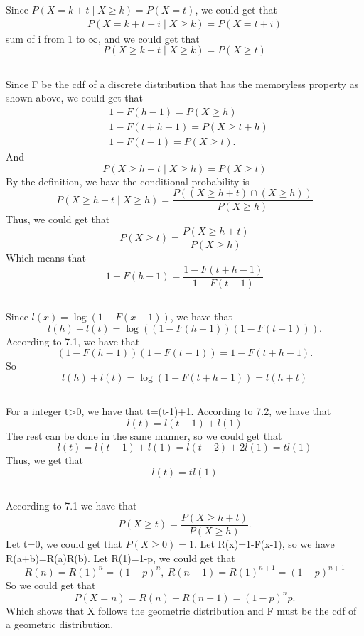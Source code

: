 \documentclass[10.5pt]{article}
\begin{document}
\section{}
Since $P(X=k+t\mid X\geqslant k)=P(X=t)$, we could get that $$\begin{aligned}
    P(X=k+t+i\mid X\geqslant k)=P(X=t+i)
\end{aligned}$$\indent
sum of i from 1 to $\infty$, and we could get that $$P(X\geqslant k+t\mid X\geqslant k)=P(X\geqslant t)$$\indent
\subsection{}
Since F be the cdf of a discrete distribution that has the memoryless property as shown above, we could get that $$\begin{aligned}
    &1-F(h-1)=P(X\geqslant h)\\
    &1-F(t+h-1)=P(X\geqslant t+h)\\
    &1-F(t-1)=P(X\geqslant t).
\end{aligned}$$\indent
And $$P(X\geqslant h+t\mid X\geqslant h)=P(X\geqslant t)$$\indent
By the definition, we have the conditional probability is $$P(X\geqslant h+t\mid X\geqslant h)=\frac{P((X\geqslant h+t)\cap (X\geqslant h))}{P(X\geqslant h)}$$\indent
Thus, we could get that $$P(X\geqslant t)=\frac{P(X\geqslant h+t)}{P(X\geqslant h)}$$\indent
Which means that $$1-F(h-1)=\frac{1-F(t+h-1)}{1-F(t-1)}$$
\subsection{}
Since $l(x)=\log(1-F(x-1))$, we have that $$l(h)+l(t)=\log((1-F(h-1))(1-F(t-1))).$$\indent
According to 7.1, we have that $$(1-F(h-1))(1-F(t-1))=1-F(t+h-1).$$\indent
So $$l(h)+l(t)=\log(1-F(t+h-1))=l(h+t)$$
\subsection{}
For a integer t>0, we have that t=(t-1)+1. According to 7.2, we have that $$l(t)=l(t-1)+l(1)$$\indent
The rest can be done in the same manner, so we could get that $$l(t)=l(t-1)+l(1)=l(t-2)+2l(1)=tl(1)$$\indent
Thus, we get that $$l(t)=tl(1)$$
\subsection{}
According to 7.1 we have that $$P(X\geqslant t)=\frac{P(X\geqslant h+t)}{P(X\geqslant h)}.$$\indent
Let t=0, we could get that $P(X\geqslant 0)=1$. Let R(x)=1-F(x-1), so we have R(a+b)=R(a)R(b). Let R(1)=1-p, we could get that $$R(n)=R(1)^n=(1-p)^n,~R(n+1)=R(1)^{n+1}=(1-p)^{n+1}$$\indent
So we could get that $$P(X=n)=R(n)-R(n+1)=(1-p)^np.$$\indent
Which shows that X follows the geometric distribution and F must be the cdf of a geometric distribution.
\end{document}
